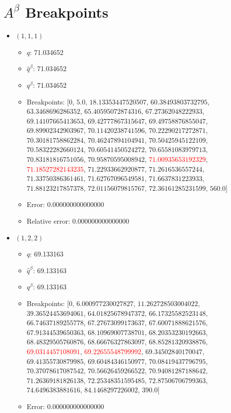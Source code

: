 \documentclass{article}%
\begin{document}
\section{$A^\beta$ Breakpoints}%
\thispagestyle{plain}%
\begin{itemize}%
	\item $(1, 1, 1)$%
	\begin{itemize}%
		\item $q$: 71.034652%
		\item $\hat{q}^\beta$: 71.034652%
		\item $q^\beta$: 71.034652%
		\item Breakpoints: $[$$0$, $5.0$, $18.13353447520507$, $60.38493803732795$, $63.3468696286352$, $65.40595072874316$, $67.27362048222933$, $69.14107665413653$, $69.42777867315647$, $69.49758876855047$, $69.89902342903967$, $70.11420238741596$, $70.22290217272871$, $70.30181758862284$, $70.46247894104941$, $70.50425945122109$, $70.58322282660124$, $70.60541450524272$, $70.65581083979713$, $70.83181816751056$, $70.95870595008942$, \textcolor{red}{$71.00935653192329$}, \textcolor{red}{$71.18527282143235$}, $71.22933662920877$, $71.2616536557244$, $71.33750386361461$, $71.62767096549581$, $71.6637831223933$, $71.88123217857378$, $72.01156079815767$, $72.36161285231599$, $560.0$$]$%
		\item Error: 0.000000000000000%
		\item Relative error: 0.000000000000000%
	\end{itemize}%
	\item $(1, 2, 2)$%
	\begin{itemize}%
		\item $q$: 69.133163%
		\item $\hat{q}^\beta$: 69.133163%
		\item $q^\beta$: 69.133163%
		\item Breakpoints: $[$$0$, $6.000977230027827$, $11.262728503004022$, $39.36524453694061$, $64.01825678947372$, $66.17325582523148$, $66.74637189255778$, $67.27673099173637$, $67.60071888621576$, $67.91344539650363$, $68.10969007738701$, $68.20353230192663$, $68.48329505760876$, $68.66676327863097$, $68.85281320938876$, \textcolor{red}{$69.0314457108091$}, \textcolor{red}{$69.22655548799992$}, $69.34502840170047$, $69.41355730879985$, $69.60484346150977$, $70.08419437796795$, $70.37078617087542$, $70.56626459266522$, $70.94081287188642$, $71.26369181826138$, $72.25348351595485$, $72.87506706799363$, $74.6496383881616$, $84.1468297226002$, $390.0$$]$%
		\item Error: 0.000000000000000%

\end{itemize}
\end{itemize}
\end{document}

